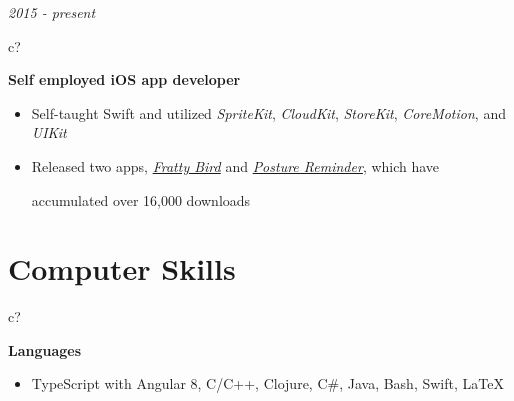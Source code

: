 \documentclass[12pt,a4paper,sans]{moderncv} %
\begin{document}
 
 \textit{2015 - present}
\hspace{-1.7 mm}
\begin{tabular}{c?}
 \\
\end{tabular}
 \hspace{2 mm}
 \textbf{Self employed iOS app developer} 
 
 \begin{itemize}
 \addtolength{\itemindent}{31.7 mm}
    \item Self-taught Swift and utilized \textit{SpriteKit}, \textit{CloudKit}, \textit{StoreKit}, \textit{CoreMotion}, and \textit{UIKit}
 \item Released two apps, \href{https://itunes.apple.com/us/app/fratty-bird-the-game/id1143642394?mt=8}{\textit{Fratty Bird}} and \href{https://itunes.apple.com/us/app/posture-reminder/id1280214465?mt=8}{\textit{Posture Reminder}}, which have 
 
   \hspace{30.5 mm}  accumulated over 16,000 downloads
   
 \end{itemize}
 
\begin{comment}
Rank yourself on proficiency in each. I broke mine down into "Advanced Knowledge", "Working Proficiency", and "Limited Exposure"
\end{comment}

\vspace{-4 mm}
\section{Computer Skills}


 \hspace{24.5 mm}
\begin{tabular}{c?}
 \\
\end{tabular}
 \hspace{2 mm}
 \textbf{Languages}
 
\begin{itemize}
\addtolength{\itemindent}{31.7 mm}
\item{TypeScript with Angular 8, C/C++, Clojure, C\#, Java, Bash, Swift, \LaTeX}
\end{itemize}
\end{document}
